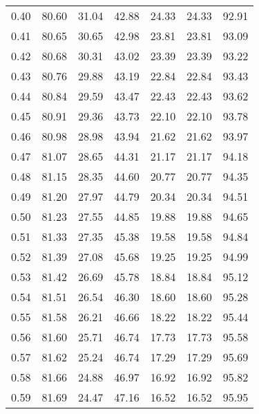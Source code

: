 \begin{tabular}{|c|c|c|c|c|c|c|}
      0.40 &     80.60 &     31.04 &      42.88 &   24.33 &      24.33 &         92.91 \\
      0.41 &     80.65 &     30.65 &      42.98 &   23.81 &      23.81 &         93.09 \\
      0.42 &     80.68 &     30.31 &      43.02 &   23.39 &      23.39 &         93.22 \\
      0.43 &     80.76 &     29.88 &      43.19 &   22.84 &      22.84 &         93.43 \\
      0.44 &     80.84 &     29.59 &      43.47 &   22.43 &      22.43 &         93.62 \\
      0.45 &     80.91 &     29.36 &      43.73 &   22.10 &      22.10 &         93.78 \\
      0.46 &     80.98 &     28.98 &      43.94 &   21.62 &      21.62 &         93.97 \\
      0.47 &     81.07 &     28.65 &      44.31 &   21.17 &      21.17 &         94.18 \\
      0.48 &     81.15 &     28.35 &      44.60 &   20.77 &      20.77 &         94.35 \\
      0.49 &     81.20 &     27.97 &      44.79 &   20.34 &      20.34 &         94.51 \\
      0.50 &     81.23 &     27.55 &      44.85 &   19.88 &      19.88 &         94.65 \\
      0.51 &     81.33 &     27.35 &      45.38 &   19.58 &      19.58 &         94.84 \\
      0.52 &     81.39 &     27.08 &      45.68 &   19.25 &      19.25 &         94.99 \\
      0.53 &     81.42 &     26.69 &      45.78 &   18.84 &      18.84 &         95.12 \\
      0.54 &     81.51 &     26.54 &      46.30 &   18.60 &      18.60 &         95.28 \\
      0.55 &     81.58 &     26.21 &      46.66 &   18.22 &      18.22 &         95.44 \\
      0.56 &     81.60 &     25.71 &      46.74 &   17.73 &      17.73 &         95.58 \\
      0.57 &     81.62 &     25.24 &      46.74 &   17.29 &      17.29 &         95.69 \\
      0.58 &     81.66 &     24.88 &      46.97 &   16.92 &      16.92 &         95.82 \\
      0.59 &     81.69 &     24.47 &      47.16 &   16.52 &      16.52 &         95.95 \\

\end{tabular}

